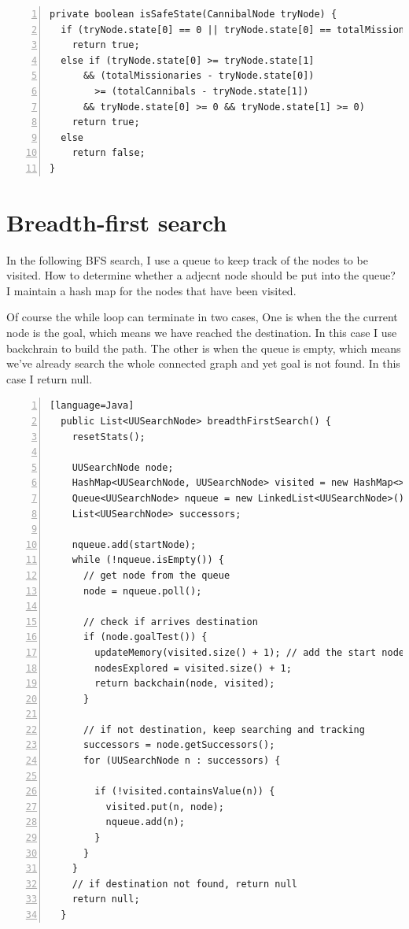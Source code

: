 \documentclass{article}
\begin{document}
\begin{lstlisting}[numbers=left]
private boolean isSafeState(CannibalNode tryNode) {
  if (tryNode.state[0] == 0 || tryNode.state[0] == totalMissionaries)
    return true;
  else if (tryNode.state[0] >= tryNode.state[1]
      && (totalMissionaries - tryNode.state[0])
      	>= (totalCannibals - tryNode.state[1])
      && tryNode.state[0] >= 0 && tryNode.state[1] >= 0)
    return true;
  else
    return false;
}
\end{lstlisting}



\section{Breadth-first search}

In the following BFS search, I use a queue to keep track of the nodes to be visited. How to determine whether a adjecnt node should be put into the queue? I maintain a hash map for the nodes that have been visited.

Of course the while loop can terminate in two cases, One is when the the current node is the goal, which means we have reached the destination. In this case I use backchrain to build the path. The other is when the queue is empty, which means we've already search the whole connected graph and yet goal is not found. In this case I return null.

\begin{lstlisting}[numbers=left][language=Java]
  public List<UUSearchNode> breadthFirstSearch() {
    resetStats();

    UUSearchNode node;
    HashMap<UUSearchNode, UUSearchNode> visited = new HashMap<>();
    Queue<UUSearchNode> nqueue = new LinkedList<UUSearchNode>();
    List<UUSearchNode> successors;

    nqueue.add(startNode);
    while (!nqueue.isEmpty()) {
      // get node from the queue
      node = nqueue.poll();

      // check if arrives destination
      if (node.goalTest()) {
        updateMemory(visited.size() + 1); // add the start node
        nodesExplored = visited.size() + 1;
        return backchain(node, visited);
      }

      // if not destination, keep searching and tracking
      successors = node.getSuccessors();
      for (UUSearchNode n : successors) {

        if (!visited.containsValue(n)) {
          visited.put(n, node);
          nqueue.add(n);
        }
      }
    }
    // if destination not found, return null
    return null;
  }
\end{lstlisting}
\end{document}
